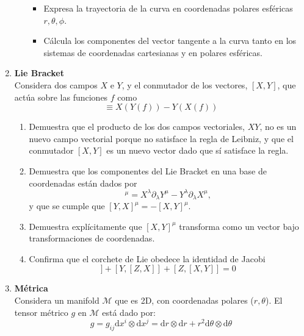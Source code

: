 \documentclass[../main]{subfiles}
\begin{document}
\begin{adjustwidth}{0pt}{-100pt}
\begin{enumerate}
\begin{enumerate}[label=(\alph*)]
\begin{itemize}
            \item Expresa la trayectoria de la curva en coordenadas polares esféricas $r, \theta, \phi$.
            \item Cálcula los componentes del vector tangente a la curva tanto en los sistemas de coordenadas cartesianas y en polares esféricas.
        \end{itemize}
    \end{enumerate}
    \item \textbf{Lie Bracket} \\
    Considera dos campos $X$ e $Y$, y el conmutador de los vectores, $[X, Y]$, que actúa sobre las funciones $f$ como
    \begin{equation}
        [X, Y]\equiv X(Y(f))-Y(X(f))
    \end{equation}
    \begin{enumerate}[label=(\alph*)]
        \item Demuestra que el producto de los dos campos vectoriales, $XY$, no es un nuevo campo vectorial porque no satisface la regla de Leibniz, y que el conmutador $[X, Y]$ es un nuevo vector dado que sí satisface la regla.
        \item Demuestra que los componentes del Lie Bracket en una base de coordenadas están dados por 
        \begin{equation}
            [X, Y]^{\mu}=X^{\lambda}\partial_{\lambda}Y^{\mu}-Y^{\lambda}\partial_{\lambda}X^{\mu},
        \end{equation}
        y que se cumple que $[Y, X]^{\mu}=-[X, Y]^{\mu}$.
        \item Demuestra explícitamente que $[X, Y]^{\mu}$ transforma como un vector bajo transformaciones de coordenadas.
        \item Confirma que el corchete de Lie obedece la identidad de Jacobi
        \begin{equation}
            [X, [Y, Z]]+[Y, [Z, X]]+[Z, [X, Y]]=0
        \end{equation}
    \end{enumerate}
    \item \textbf{Métrica} \\
    Considera un manifold $\mathcal{M}$ que es 2D, con coordenadas polares ($r, \theta$). El tensor métrico $g$ en $\mathcal{M}$ está dado por:
    \begin{equation}
        g=g_{ij}\mathrm{d}x^{i}\otimes \mathrm{d}x^j=\mathrm{d}r\otimes \mathrm{d}r+r^2\mathrm{d}\theta\otimes\mathrm{d}\theta
    \end{equation}

\end{enumerate}
\end{adjustwidth}
\end{document}
